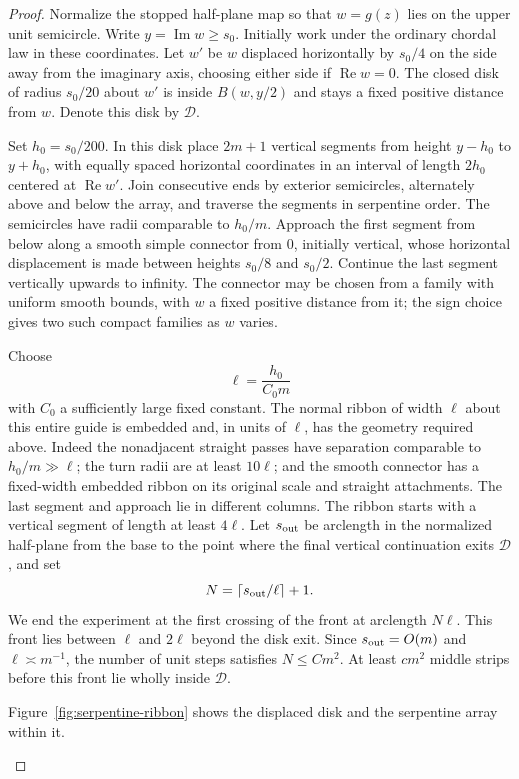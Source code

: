 \documentclass[11pt]{article}
\theoremstyle{definition}
\theoremstyle{remark}
\numberwithin{equation}{section}
\begin{document}
\begin{proof}
Normalize the stopped half-plane map so that $w=g(z)$ lies on the upper
unit semicircle.  Write $y=\operatorname{Im}w\ge s_0$.  Initially work
under the ordinary chordal law in these coordinates.  Let $w'$ be
$w$ displaced horizontally by $s_0/4$ on the side away from the imaginary
axis, choosing either side if $\operatorname{Re}w=0$.  The closed disk
of radius $s_0/20$ about $w'$ is inside $B(w,y/2)$ and stays a fixed
positive distance from $w$. Denote this disk by $\mathcal D$.

Set $h_0=s_0/200$.  In this disk place $2m+1$ vertical segments from
height $y-h_0$ to $y+h_0$, with equally spaced horizontal coordinates
in an interval of length $2h_0$ centered at $\operatorname{Re}w'$.
Join consecutive ends by exterior semicircles, alternately above and
below the array, and traverse the segments in serpentine order.  The
semicircles have radii comparable to $h_0/m$.  Approach the first segment
from below along a smooth simple connector from $0$, initially vertical,
whose horizontal displacement is made between heights $s_0/8$ and
$s_0/2$.  Continue the last segment vertically upwards to infinity.
The connector may be chosen from a family with uniform smooth bounds,
with $w$ a fixed positive distance from it; the sign choice gives two
such compact families as $w$ varies.

Choose
\[
 \ell=\frac{h_0}{C_0m}
\]
with $C_0$ a sufficiently large fixed constant.  The normal ribbon of
width $\ell$ about this entire guide is embedded and, in units of
$\ell$, has the geometry required above.  Indeed the nonadjacent
straight passes have separation comparable to $h_0/m\gg\ell$;
the turn radii are at least $10\ell$; and the smooth connector has a
fixed-width embedded ribbon on its original scale and straight
attachments.  The last segment and approach lie in different columns.
The ribbon starts with a vertical segment of length at least $4\ell$.
Let $s_{\rm out}$ be arclength in the normalized half-plane from the
base to the point where the final vertical continuation exits $\mathcal D$,
and set
\[
 N=\left\lceil s_{\rm out}/\ell\right\rceil+1.
\]
We end the experiment at the first crossing of the front at arclength
$N\ell$. This front lies between $\ell$ and $2\ell$ beyond the disk
exit. Since $s_{\rm out}=O(m)$ and $\ell\asymp m^{-1}$, the number of
unit steps satisfies $N\le Cm^2$. At least $cm^2$ middle strips before
this front lie wholly inside $\mathcal D$.

Figure~\ref{fig:serpentine-ribbon} shows the displaced disk and the
serpentine array within it.
\begin{figure}[!htbp]


\end{figure}
\end{proof}
\end{document}
